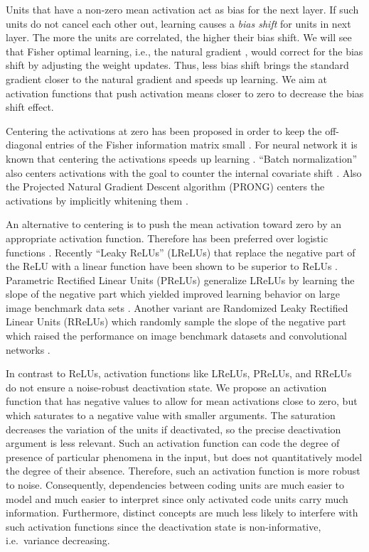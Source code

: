 \documentclass{article}
\begin{document}
Units that have a non-zero mean activation act as bias for
the next layer.
If such units do not cancel each other out,
learning causes a {\em bias shift} for units in next layer.
The more the units are correlated, the higher their bias shift.
We will see that Fisher optimal learning, i.e., the natural
gradient \citep{Amari:98},
would correct for the bias shift
by adjusting the weight updates.
Thus, less bias shift brings the standard gradient closer to
the natural gradient and speeds up learning.
We aim at activation functions that push activation means closer to zero
to decrease the bias shift effect.

Centering the activations at zero
has been proposed in order to keep the off-diagonal entries of the
Fisher information matrix small \citep{Raiko:12}.
For neural network it is known that centering the activations
speeds up learning \citep{LeCun:91,LeCun:98,Schraudolph:98}.
``Batch normalization'' also centers activations with the goal
to counter the internal covariate shift \citep{Ioffe:15}.
Also the Projected Natural Gradient Descent algorithm (PRONG)
centers the activations by implicitly whitening them
\citep{Desjardins:15}.


An alternative to centering is to push the mean activation toward zero by
an appropriate activation function.
Therefore  has been preferred over
logistic functions \citep{LeCun:91,LeCun:98}.
Recently ``Leaky ReLUs'' (LReLUs)
that replace the negative part of the ReLU with a linear function
have been shown to be superior to ReLUs \citep{Maas:13}.
Parametric Rectified Linear Units (PReLUs) generalize LReLUs
by learning the slope of the negative part which yielded
improved learning behavior on large image benchmark data sets \citep{He:15}.
Another variant are
Randomized Leaky Rectified Linear Units (RReLUs) which randomly sample
the slope of the negative part which raised the performance on
image benchmark datasets and convolutional networks \citep{Xu:15}.

In contrast to ReLUs, activation functions like
LReLUs, PReLUs, and RReLUs do not
ensure a noise-robust deactivation state.
We propose an activation function that has negative
values to allow for mean activations close to zero,
but which saturates to a negative value with smaller arguments.
The saturation decreases the variation of the units if
deactivated, so the precise deactivation argument is less relevant.
Such an activation function can code the degree of presence of
particular phenomena in the input, but does
not quantitatively model the degree of their absence.
Therefore, such an activation function is more robust to noise.
Consequently, dependencies between
coding units are much easier to model and much easier to interpret
since only activated code units carry much information.
Furthermore, distinct concepts are much less likely to interfere with
such activation functions since the deactivation state is
non-informative, i.e.\ variance decreasing.
\end{document}
